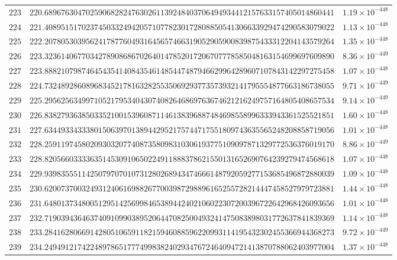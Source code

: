 \documentclass[12pt,reqno]{amsart}
\theoremstyle{remark}
\begin{document}
\begin{longtable}{clc}
$223$ & $220.6896763047025906828247630261139248403706494934412157633157405014860441$ & $1.19\times 10^{-448}$ \\
$224$ & $221.4089515170237450332494205710778230172808850541306633929474290583079022$ & $1.13\times 10^{-448}$ \\
$225$ & $222.2078053039562417877604931645657466319052905900839875433312204143579264$ & $1.35\times 10^{-448}$ \\
$226$ & $223.3236140677034278908686702640147852017206707778585048163154699697609890$ & $8.36\times 10^{-449}$ \\
$227$ & $223.8882107987464543541408435461485447487946629964289607107843142297275458$ & $1.07\times 10^{-448}$ \\
$228$ & $224.7324892860896834521781632825535069293773573932141795554877663186738055$ & $9.71\times 10^{-449}$ \\
$229$ & $225.2956256349971052179534043074082646869763674621216249757164805408657534$ & $9.14\times 10^{-449}$ \\
$230$ & $226.8382793638503352100153960871146138396887484698558996333943361525521851$ & $1.60\times 10^{-448}$ \\
$231$ & $227.6344933433380150639701389442952175744717551809743635565248208858719056$ & $1.01\times 10^{-448}$ \\
$232$ & $228.2591197458020930320774087358098310306193775109097871329772536376019170$ & $8.86\times 10^{-449}$ \\
$233$ & $228.8205660333363514530910650224911888378621550131652690764239279474568618$ & $1.07\times 10^{-448}$ \\
$234$ & $229.9398355511425079707010731280268943474666148792059277153685496872880039$ & $1.09\times 10^{-448}$ \\
$235$ & $230.6200737003249312406169882677003987298896165255728214447458527979723881$ & $1.44\times 10^{-448}$ \\
$236$ & $231.6480137348005129514256998465389442402106022307200396722642968426093656$ & $1.01\times 10^{-448}$ \\
$237$ & $232.7190394364637409109903895206447082500493241475083898031772637841839369$ & $1.14\times 10^{-448}$ \\
$238$ & $233.2841628066914280510659118215946088596220993114195432302455366944368273$ & $9.72\times 10^{-449}$ \\
$239$ & $234.2494912174224897865177749983824029347672464094721413870788062403977004$ & $1.37\times 10^{-448}$ \\

\end{longtable}
\end{document}
